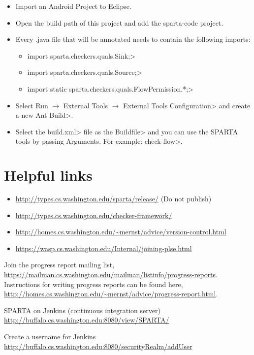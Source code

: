 \begin{itemize}
\item Import an Android Project to Eclipse. 
\item Open the build path of this project and add the sparta-code project.
\item Every .java file that will be annotated needs to contain the 
following imports:
  \begin{itemize}
    \item \<import  sparta.checkers.quals.Sink;>
    \item \<import  sparta.checkers.quals.Source;>
    \item \<import static sparta.checkers.quals.FlowPermission.*;>
  \end{itemize}
\item Select \<Run $\rightarrow$ External Tools $\rightarrow$ External Tools Configuration> 
and create a new \<Ant Build>.
\item Select the \<build.xml> file as the \<Buildfile> and you can use the SPARTA tools by passing
Arguments. For example: \<check-flow>.
\end{itemize}


\section{Helpful links\label{dev-links}}

\begin{itemize}
\item \url{http://types.cs.washington.edu/sparta/release/} (Do not publish)
\item \url{http://types.cs.washington.edu/checker-framework/  }

\item \url{http://homes.cs.washington.edu/~mernst/advice/version-control.html}
\item \url{https://wasp.cs.washington.edu/Internal/joining-plse.html}
\end{itemize}

Join the progress report mailing list, \url{https://mailman.cs.washington.edu/mailman/listinfo/progress-reports}.
 Instructions for writing progress reports can be found here, \url{http://homes.cs.washington.edu/~mernst/advice/progress-report.html}.

SPARTA on Jenkins (continuous integration server) \url{http://buffalo.cs.washington.edu:8080/view/SPARTA/}

Create a username for Jenkins \url{http://buffalo.cs.washington.edu:8080/securityRealm/addUser}

